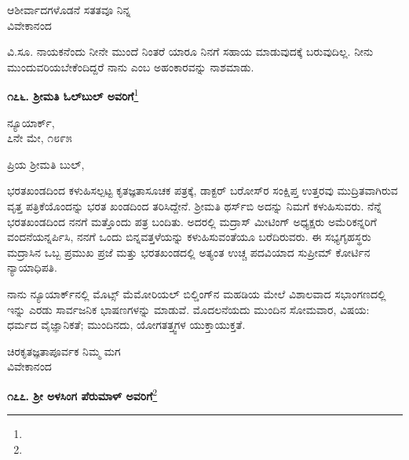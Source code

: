 \vspace{-0.5cm}

\begin{flushright}
ಆಶೀರ್ವಾದಗಳೊಡನೆ ಸತತವೂ ನಿನ್ನ\\ವಿವೇಕಾನಂದ
\end{flushright}

\vspace{-0.3cm}

ವಿ.ಸೂ.\enginline{-} ನಾಯಕನೆಂದು ನೀನೇ ಮುಂದೆ ನಿಂತರೆ ಯಾರೂ ನಿನಗೆ ಸಹಾಯ ಮಾಡುವುದಕ್ಕೆ ಬರುವುದಿಲ್ಲ. ನೀನು ಮುಂದುವರಿಯಬೇಕೆಂದಿದ್ದರೆ ನಾನು ಎಂಬ ಅಹಂಕಾರವನ್ನು ನಾಶಮಾಡು.

\begin{center}
\textbf{೧೭೬. ಶ‍್ರೀಮತಿ ಓಲ್‌ಬುಲ್ ಅವರಿಗೆ}\footnote{}
\end{center}

\vspace{-0.5cm}

\begin{flushright}
ನ್ಯೂಯಾರ್ಕ್,\\೭ನೇ ಮೇ, ೧೮೯೫
\end{flushright}

\vspace{-0.5cm}

\noindent
ಪ್ರಿಯ ಶ‍್ರೀಮತಿ ಬುಲ್,

ಭರತಖಂಡದಿಂದ ಕಳುಹಿಸಲ್ಪಟ್ಟ ಕೃತಜ್ಞತಾಸೂಚಕ ಪತ್ರಕ್ಕೆ, ಡಾಕ್ಟರ್ ಬರೋಸ್‌ರ ಸಂಕ್ಷಿಪ್ತ ಉತ್ತರವು ಮುದ್ರಿತವಾಗಿರುವ ವೃತ್ತ ಪತ್ರಿಕೆಯೊಂದನ್ನು ಭರತ ಖಂಡದಿಂದ ತರಿಸಿದ್ದೇನೆ. ಶ‍್ರೀಮತಿ ಥರ್ಸ್‌ಬಿ ಅದನ್ನು ನಿಮಗೆ ಕಳುಹಿಸುವರು. ನೆನ್ನೆ ಭರತಖಂಡದಿಂದ ನನಗೆ ಮತ್ತೊಂದು ಪತ್ರ ಬಂದಿತು. ಅದರಲ್ಲಿ ಮದ್ರಾಸ್ ಮೀಟಿಂಗ್ ಅಧ್ಯಕ್ಷರು ಅಮೆರಿಕನ್ನರಿಗೆ ವಂದನೆಯನ್ನರ್ಪಿಸಿ, ನನಗೆ ಒಂದು ಬಿನ್ನವತ್ತಳೆಯನ್ನು ಕಳುಹಿಸುವಂತೆಯೂ ಬರೆದಿರುವರು. ಈ ಸಭ್ಯಗೃಹಸ್ಥರು ಮದ್ರಾಸಿನ ಒಬ್ಬ ಪ್ರಮುಖ ಪ್ರಜೆ ಮತ್ತು ಭರತಖಂಡದಲ್ಲಿ ಅತ್ಯಂತ ಉಚ್ಚ ಪದವಿಯಾದ ಸುಪ್ರೀಮ್ ಕೋರ್ಟಿನ ನ್ಯಾಯಾಧಿಪತಿ.

ನಾನು ನ್ಯೂಯಾರ್ಕ್‌ನಲ್ಲಿ ಮೊಟ್ಸ್ ಮೆಮೋರಿಯಲ್ ಬಿಲ್ಡಿಂಗ್‌ನ ಮಹಡಿಯ ಮೇಲೆ ವಿಶಾಲವಾದ ಸಭಾಂಗಣದಲ್ಲಿ ಇನ್ನು ಎರಡು ಸಾರ್ವಜನಿಕ ಭಾಷಣಗಳನ್ನು ಮಾಡುವೆ. ಮೊದಲನೆಯದು ಮುಂದಿನ ಸೋಮವಾರ, ವಿಷಯ: ಧರ್ಮದ ವೈಜ್ಞಾನಿಕತೆ; ಮುಂದಿ\break ನದು, ಯೋಗತತ್ತ್ವಗಳ ಯುಕ್ತಾಯುಕ್ತತೆ.

\vspace{-0.4cm}

{\flushright
ಚಿರಕೃತಜ್ಞತಾಪೂರ್ವಕ ನಿಮ್ಮ ಮಗ\\ವಿವೇಕಾನಂದ\par}

\begin{center}
\textbf{೧೭೭. ಶ‍್ರೀ ಅಳಸಿಂಗ ಪೆರುಮಾಳ್ ಅವರಿಗೆ}\footnote{}
\end{center}

\vspace{-0.5cm}

